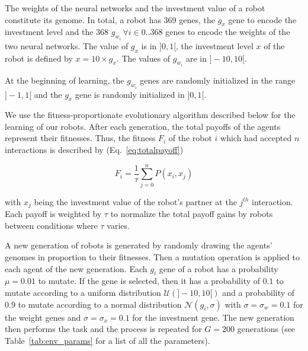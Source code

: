 \documentclass[letterpaper]{article}
\begin{document}
The weights of the neural networks and the investment value of a robot constitute its genome. In total, a robot has $369$ genes, the $g_x$ gene to encode the investment level and the 368 $g_{w_i}\,\forall i \in 0..368$ genes to encode the weights of the two neural networks. The value of $g_x$ is in $]0, 1[$, the investment level $x$ of the robot is defined by $x = 10 \times g_x$. The values of $g_{w_i}$ are in $]-10, 10[$.

At the beginning of learning, the $g_{w_i}$ genes are randomly initialized in the range $]-1, 1[$ and the $g_x$ gene is randomly initialized in $]0, 1[$.

We use the fitness-proportionate evolutionary algorithm described below for the learning of our robots. After each generation, the total payoffs of the agents represent their fitnesses. Thus, the fitness $F_i$ of the robot $i$  which had accepted $n$ interactions is described by (Eq.~\ref{eq:totalpayoff})


\begin{equation}
    F_i = \frac{1}{\tau} \sum_{j=0}^{n} P(x_i, x_j) \label{eq:totalpayoff}
\end{equation}  

with $x_j$ being the investment value of the robot's partner at the $j^{th}$ interaction. Each payoff is weighted by $\tau$ to normalize the total payoff gains by robots between conditions where $\tau$ varies.

A new generation of robots is generated by randomly drawing the agents' genomes in proportion to their fitnesses. Then a mutation operation is applied to each agent of the new generation. Each $g_i$ gene of a robot has a probability $\mu = 0.01$ to mutate. If the gene is selected, then it has a probability of $0.1$ to mutate according to a uniform distribution $\mathcal{U}(]-10, 10[)$ and a probability of $0.9$ to mutate according to a normal distribution $\mathcal{N}(g_i, \sigma)$ with $\sigma = \sigma_w = 0.1$ for the weight genes and $\sigma = \sigma_x = 0.1$ for the investment gene. The new generation then performs the task and the process is repeated for $G = 200$ generations (see Table~\ref{tab:env_params} for a list of all the parameters). 
\end{document}
